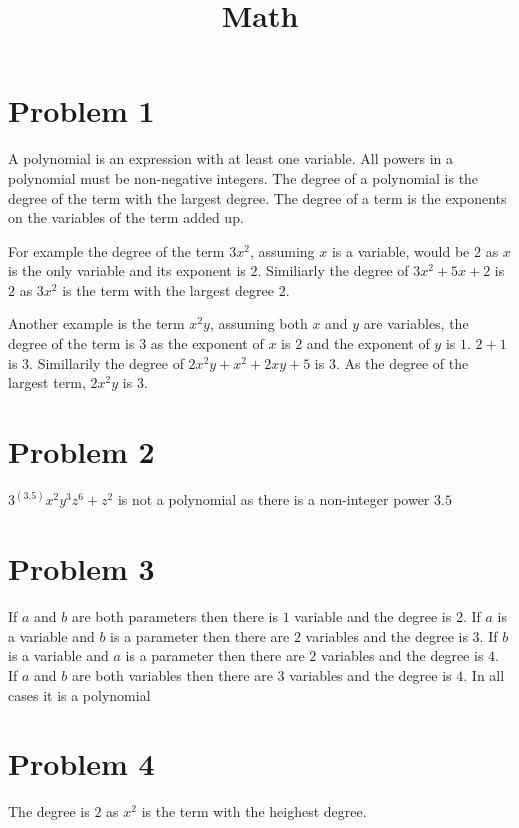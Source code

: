 \documentclass[12pt, letterpaper, twoside]{article}
\title{Math}
\begin{document}
	
	\maketitle
\section{Problem 1}
A polynomial is an expression with at least one variable. All powers in a polynomial must be non-negative integers. The degree of a polynomial is the degree of the term with the largest degree. The degree of a term is the exponents on the variables of the term added up.\par
For example the degree of the term $3x^2$, assuming $x$ is a variable, would be $2$ as $x$ is the only variable and its exponent is $2$. Similiarly the degree of $3x^2 + 5x +2$ is $2$ as $3x^2$ is the term with the largest degree $2$. \par
Another example is the term $x^2y$, assuming both $x$ and $y$ are variables, the degree of the term is $3$ as the exponent of $x$ is $2$ and the exponent of $y$ is $1$. $2 + 1$ is $3$. Simillarily the degree of $2x^2y + x^2 + 2xy + 5$ is $3$. As the degree of the largest term, $2x^2y$ is $3$. 
\section{Problem 2}
$3^(3.5)x^2y^3z^6 + z^2$ is not a polynomial as there is a non-integer power $3.5$
\section{Problem 3}
If $a$ and $b$ are both parameters then there is $1$ variable and the degree is $2$. If $a$ is a variable and $b$ is a parameter then there are $2$ variables and the degree is $3$. If $b$ is a variable and $a$ is a parameter then there are $2$ variables and the degree is $4$. If $a$ and $b$ are both variables then there are $3$ variables and the degree is $4$. In all cases it is a polynomial
\section{Problem 4}
The degree is $2$ as $x^2$ is the term with the heighest degree.
	
\end{document}
